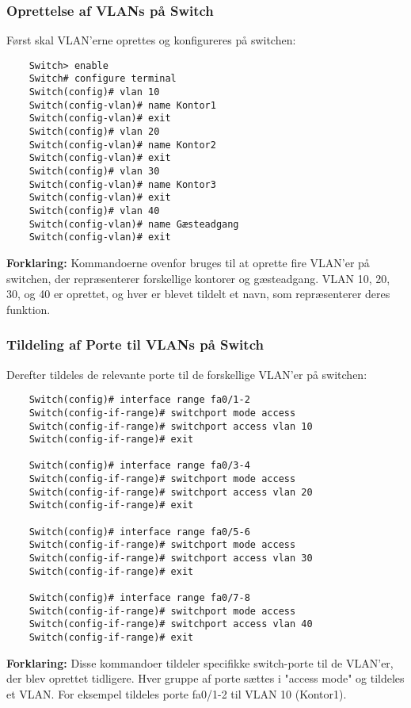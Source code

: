 \subsubsection{Oprettelse af VLANs på Switch}
Først skal VLAN'erne oprettes og konfigureres på switchen:

\begin{verbatim}
	Switch> enable
	Switch# configure terminal
	Switch(config)# vlan 10
	Switch(config-vlan)# name Kontor1
	Switch(config-vlan)# exit
	Switch(config)# vlan 20
	Switch(config-vlan)# name Kontor2
	Switch(config-vlan)# exit
	Switch(config)# vlan 30
	Switch(config-vlan)# name Kontor3
	Switch(config-vlan)# exit
	Switch(config)# vlan 40
	Switch(config-vlan)# name Gæsteadgang
	Switch(config-vlan)# exit
\end{verbatim}

\noindent\textbf{Forklaring:} Kommandoerne ovenfor bruges til at oprette fire VLAN'er på switchen, der repræsenterer forskellige kontorer og gæsteadgang. VLAN 10, 20, 30, og 40 er oprettet, og hver er blevet tildelt et navn, som repræsenterer deres funktion.

\subsubsection{Tildeling af Porte til VLANs på Switch}
Derefter tildeles de relevante porte til de forskellige VLAN'er på switchen:

\begin{verbatim}
	Switch(config)# interface range fa0/1-2
	Switch(config-if-range)# switchport mode access
	Switch(config-if-range)# switchport access vlan 10
	Switch(config-if-range)# exit
	
	Switch(config)# interface range fa0/3-4
	Switch(config-if-range)# switchport mode access
	Switch(config-if-range)# switchport access vlan 20
	Switch(config-if-range)# exit
	
	Switch(config)# interface range fa0/5-6
	Switch(config-if-range)# switchport mode access
	Switch(config-if-range)# switchport access vlan 30
	Switch(config-if-range)# exit
	
	Switch(config)# interface range fa0/7-8
	Switch(config-if-range)# switchport mode access
	Switch(config-if-range)# switchport access vlan 40
	Switch(config-if-range)# exit
\end{verbatim}

\noindent\textbf{Forklaring:} Disse kommandoer tildeler specifikke switch-porte til de VLAN'er, der blev oprettet tidligere. Hver gruppe af porte sættes i "access mode" og tildeles et VLAN. For eksempel tildeles porte fa0/1-2 til VLAN 10 (Kontor1).

